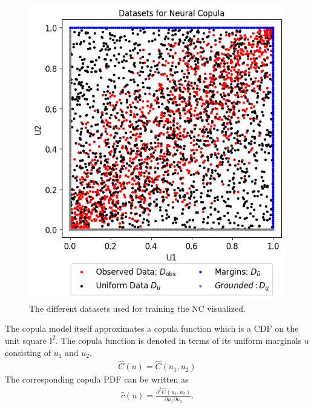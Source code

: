 \begin{figure}
    \centering
    \includegraphics[width=0.5\linewidth]{3Theory/pictures/DatasetsNC.png}
    \caption{The different datasets used for training the \gls{NC} visualized.}
    \label{fig:datasetsNC}
\end{figure}

The copula model itself approximates a copula function which is a \gls{CDF} on the unit square $\mathbb{I}^2$. The copula function is denoted in terms of its uniform marginals $u$ consisting of $u_1$ and $u_2$. 
\begin{align*}
    \hat{C}(u) = \hat{C}(u_1,u_2) 
\end{align*}
The corresponding copula \gls{PDF} can be written as  
\begin{align*}
    \hat{c}(u) = \frac{\partial^2 \hat{C}(u_1,u_2)}{\partial u_1 \partial u_2}. 
\end{align*}
 
